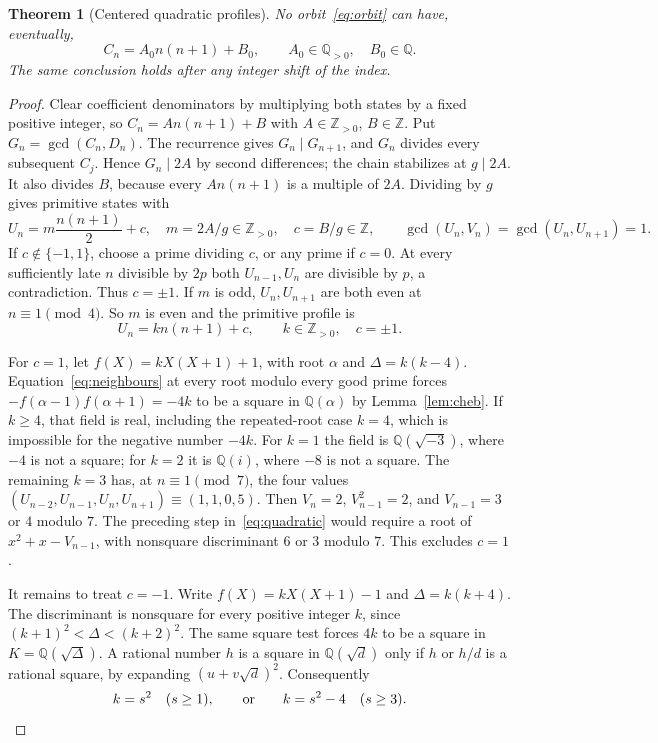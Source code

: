 \documentclass[11pt]{article}
\newtheorem{theorem}{Theorem}
\newcommand{\Q}{\mathbb Q}
\newcommand{\Z}{\mathbb Z}
\begin{document}
\begin{theorem}[Centered quadratic profiles]\label{thm:profiles}
No orbit~\eqref{eq:orbit} can have, eventually,
\[
 C_n=A_0 n(n+1)+B_0,\qquad A_0\in\Q_{>0},\quad B_0\in\Q.
\]
The same conclusion holds after any integer shift of the index.
\end{theorem}
\begin{proof}
Clear coefficient denominators by multiplying both states by a fixed
positive integer, so $C_n=A n(n+1)+B$ with $A\in\Z_{>0}$, $B\in\Z$.
Put $G_n=\gcd(C_n,D_n)$. The recurrence gives $G_n\mid G_{n+1}$,
and $G_n$ divides every subsequent $C_j$. Hence $G_n\mid2A$ by
second differences; the chain stabilizes at $g\mid2A$. It also divides
$B$, because every $A n(n+1)$ is a multiple of $2A$. Dividing by $g$
gives primitive states with
\[
 U_n=m\frac{n(n+1)}2+c,\quad m=2A/g\in\Z_{>0},\quad c=B/g\in\Z,
 \qquad \gcd(U_n,V_n)=\gcd(U_n,U_{n+1})=1.
\]
If $c\notin\{-1,1\}$, choose a prime dividing $c$, or any prime
if $c=0$. At every sufficiently late $n$ divisible by $2p$ both
$U_{n-1},U_n$ are divisible by $p$, a contradiction. Thus $c=\pm1$.
If $m$ is odd, $U_n,U_{n+1}$ are both even at $n\equiv1\pmod4$.
So $m$ is even and the primitive profile is
\[
 U_n=k n(n+1)+c,\qquad k\in\Z_{>0},\quad c=\pm1.
\]

For $c=1$, let $f(X)=kX(X+1)+1$, with root $\alpha$ and
$\Delta=k(k-4)$. Equation~\eqref{eq:neighbours} at every root modulo
every good prime forces
$-f(\alpha-1)f(\alpha+1)=-4k$ to be a square in $\Q(\alpha)$ by
Lemma~\ref{lem:cheb}. If $k\ge4$, that field is real, including the
repeated-root case $k=4$, which is impossible for the negative number
$-4k$. For $k=1$ the field is $\Q(\sqrt{-3})$, where $-4$ is not a
square; for $k=2$ it is $\Q(i)$, where $-8$ is not a square.
The remaining $k=3$ has, at $n\equiv1\pmod7$, the four values
$(U_{n-2},U_{n-1},U_n,U_{n+1})\equiv(1,1,0,5)$.
Then $V_n=2$, $V_{n-1}^2=2$, and $V_{n-1}=3$ or $4$ modulo $7$.
The preceding step in~\eqref{eq:quadratic} would require a root of
$x^2+x-V_{n-1}$, with nonsquare discriminant $6$ or $3$ modulo $7$.
This excludes $c=1$.

It remains to treat $c=-1$. Write $f(X)=kX(X+1)-1$ and
$\Delta=k(k+4)$. The discriminant is nonsquare for every positive
integer $k$, since $(k+1)^2<\Delta<(k+2)^2$. The same square test
forces $4k$ to be a square in $K=\Q(\sqrt\Delta)$.
A rational number $h$ is a square in $\Q(\sqrt d)$ only if $h$ or
$h/d$ is a rational square, by expanding $(u+v\sqrt d)^2$.
Consequently
\begin{equation}\label{eq:twofamilies}
 k=s^2\quad(s\ge1),\qquad\hbox{or}\qquad k=s^2-4\quad(s\ge3).
\end{equation}


\end{proof}
\end{document}
